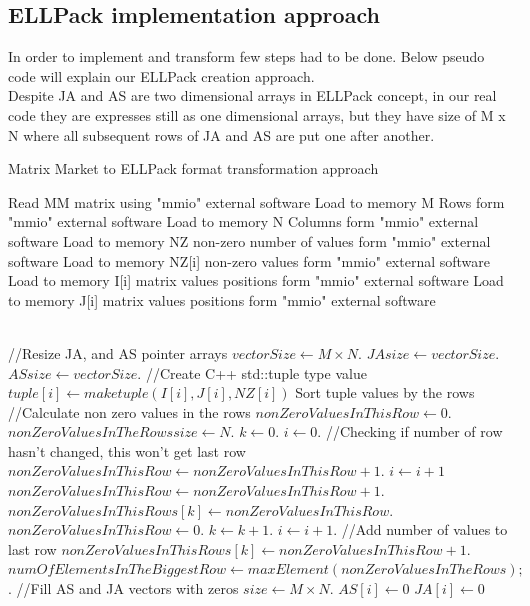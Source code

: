 \documentclass{scrreprt}
\begin{document}
\subsection{ELLPack implementation approach}

In order to implement and transform few steps had to be done. Below pseudo code will explain our ELLPack creation approach. 
\\
Despite JA and AS are two dimensional arrays in ELLPack concept, in our real code they are expresses still as one dimensional arrays, but they have size of M x N where all subsequent rows of JA and AS are put one after another.



  
\begin{algorithm}
\caption{Matrix Market to ELLPack format transformation approach}\label{euclid}
\begin{algorithmic}[1]
\State Read MM matrix using "mmio" external software
\State Load to memory M Rows form "mmio" external software
\State Load to memory N Columns form "mmio" external software
\State Load to memory NZ non-zero number of values form "mmio" external software
        \State Load to memory NZ[i] non-zero values form "mmio" external software
		\State Load to memory I[i] matrix values positions form "mmio" external software
		\State Load to memory J[i] matrix values positions  form "mmio" external software
      \EndFor

\\
\State //Resize JA, and AS pointer arrays
\State $vectorSize \gets M \times N$.
\State $JAsize \gets vectorSize$.
\State $ASsize \gets vectorSize$.
\State //Create C++ std::tuple type value
        \State $tuple[i] \gets maketuple(I[i], J[i], NZ[i])$
      \EndFor
\State
\State Sort tuple values by the rows
\State
\State //Calculate non zero values in the rows
\State $ nonZeroValuesInThisRow\gets 0$.
\State $nonZeroValuesInTheRowssize \gets N$.
\State $k \gets 0$.
\State $i \gets 0$.
		\State //Checking if number of row hasn't changed, this won't get last row
		\State $ nonZeroValuesInThisRow \gets nonZeroValuesInThisRow + 1$.
		\State $i \gets i+1$
		 \Else
		 \State $ nonZeroValuesInThisRow \gets nonZeroValuesInThisRow + 1$.
		 \State $ nonZeroValuesInThisRows[k] \gets nonZeroValuesInThisRow$.
		 \State $ nonZeroValuesInThisRow \gets 0$.
		 \State $k \gets k+1$.
		 \State $i \gets i+1$.
		\EndIf
		 \EndWhile
\State //Add number of values to last row
 \State $ nonZeroValuesInThisRows[k] \gets nonZeroValuesInThisRow+ 1$.
 \State $ numOfElementsInTheBiggestRow \gets maxElement(nonZeroValuesInTheRows);$.
 \State 
 \State //Fill AS and JA vectors with zeros
 \State $size \gets M \times N$.
        \State $AS[i] \gets 0$
         \State $JA[i] \gets 0$
      \EndFor
      
      
      \EndProcedure
{}
\end{algorithmic}
\end{algorithm}
\end{document}
